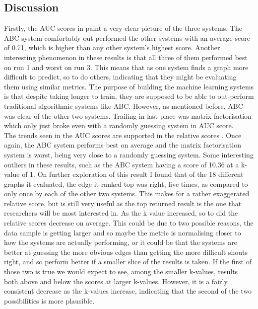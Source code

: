 \documentclass{l4proj}
\begin{document}
\subsection{Discussion}

Firstly, the AUC scores in  paint a very clear picture of the three systems. The ABC system comfortably out performed the other systems with an average score of 0.71, which is higher than any other system's highest score. Another interesting phenomenon in these results is that all three of them performed best on run 1 and worst on run 3. This means that as one system finds a graph more difficult to predict, so to do others, indicating that they might be evaluating them using similar metrics. The purpose of building the machine learning systems is that despite taking longer to train, they are supposed to be able to out-perform traditional algorithmic systems like ABC. However, as mentioned before, ABC was clear of the other two systems. Trailing in last place was matrix factorisation which only just broke even with a randomly guessing system in AUC score. \\

The trends seen in the AUC scores are supported in the relative scores . Once again, the ABC system performs best on average and the matrix factorisation system is worst, being very close to a randomly guessing system. Some interesting outliers in these results, such as the ABC system having a score of 10.36 at a k-value of 1. On further exploration of this result I found that of the 18 different graphs it evaluated, the edge it ranked top was right, five times, as compared to only once by each of the other two systems. This makes for a rather exaggerated relative score, but is still very useful as the top returned result is the one that researchers will be most interested in. As the k value increased, so to did the relative scores decrease on average. This could be due to two possible reasons, the data sample is getting larger and so maybe the metric is normalising closer to how the systems are actually performing, or it could be that the systems are better at guessing the more obvious edges than getting the more difficult shouts right, and so perform better if a smaller slice of the results is taken. If the first of those two is true we would expect to see, among the smaller k-values, results both above and below the scores at larger k-values. However, it is a fairly consistent decrease as the k-values increase, indicating that the second of the two possibilities is more plausible. \\
\end{document}
